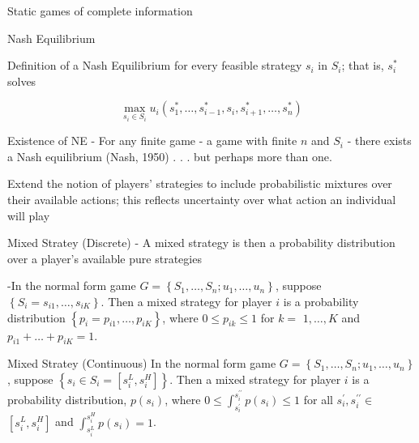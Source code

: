 \begin{titleboxchi}{Static games of complete information}
\begin{concept}{Nash Equilibrium}
\begin{definition}{Definition of a Nash Equilibrium}
            for every feasible strategy $s_{i}$ in $S_{i}$; that is, $s_{i}^{*}$ solves
            
            \[
                \max _{s_{i} \in S_{i}} u_{i}
                \left(s_{1}^{*}, \ldots, s_{i-1}^{*}, s_{i}, s_{i+1}^{*}, \ldots, s_{n}^{*}\right)
            \]
        \end{definition}
        
        \begin{proposition}{Existence of NE}
            - For any finite game - a game with finite $n$ and $S_{i}$
            - there exists a Nash equilibrium (Nash, 1950) . . . but perhaps more than one.
        \end{proposition}
    
    \end{concept}
    
    
    Extend the notion of players' strategies to include probabilistic mixtures over their available actions; this
    reflects uncertainty over what action an individual will play
    
    \begin{definition}{Mixed Stratey (Discrete)}
        - A mixed strategy is then a probability distribution over a player's available pure strategies
        
        -In the normal form game $G=\left\{S_{1}, \ldots, S_{n} ; u_{1}, \ldots, u_{n}\right\}$, suppose
        $\left\{S_{i}=s_{i 1}, \ldots, s_{i K}\right\}$. Then a mixed strategy for player $i$
        is a probability distribution $\left\{p_{i}=p_{i 1}, \ldots, p_{i K}\right\}$, where $0 \leq p_{i k} \leq 1$ for
        $k=$ $1, \ldots, K$ and $p_{i 1}+\ldots+p_{i K}=1$.
    \end{definition}
    
    \begin{definition}{Mixed Stratey (Continuous)}
        In the normal form game $G=\left\{S_{1}, \ldots, S_{n} ; u_{1}, \ldots, u_{n}\right\}$,
        suppose $\left\{s_{i} \in S_{i}=\left[s_{i}^{L}, s_{i}^{H}\right]\right\}$. Then a mixed strategy for player $i$
        is a probability distribution, $p\left(s_{i}\right)$, where
        $0 \leq \int_{s_{i}^{\prime}}^{s_{i}^{\prime \prime}} p\left(s_{i}\right) \leq 1$ for all
        $s_{i}^{\prime}, s_{i}^{\prime \prime} \in$ $\left[s_{i}^{L}, s_{i}^{H}\right]$ and
        $\int_{s_{i}^{L}}^{s_{i}^{H}} p\left(s_{i}\right)=1$.
    \end{definition}
    

\end{titleboxchi}
